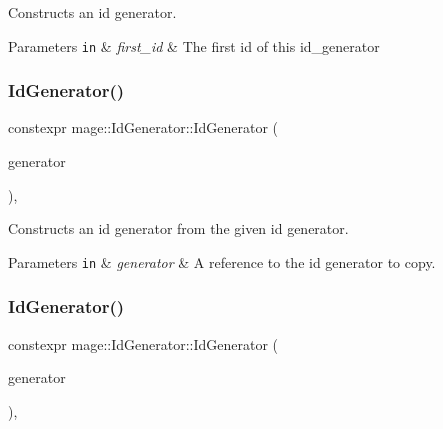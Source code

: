 Constructs an id generator.


\begin{DoxyParams}[1]{Parameters}
\mbox{\tt in}  & {\em first\+\_\+id} & The first id of this id\+\_\+generator \\
\hline
\end{DoxyParams}
\hypertarget{classmage_1_1_id_generator_ac7c7bc2371a537ca742cf87288d75817}{}\label{classmage_1_1_id_generator_ac7c7bc2371a537ca742cf87288d75817} 
\subsubsection{\texorpdfstring{Id\+Generator()}{IdGenerator()}\hspace{0.1cm}{\footnotesize\ttfamily [2/3]}}
{\footnotesize\ttfamily constexpr mage\+::\+Id\+Generator\+::\+Id\+Generator (\begin{DoxyParamCaption}\item[{const \hyperlink{classmage_1_1_id_generator}{Id\+Generator} \&}]{generator }\end{DoxyParamCaption})\hspace{0.3cm}{\ttfamily [delete]}, {\ttfamily [noexcept]}}

Constructs an id generator from the given id generator.


\begin{DoxyParams}[1]{Parameters}
\mbox{\tt in}  & {\em generator} & A reference to the id generator to copy. \\
\hline
\end{DoxyParams}
\hypertarget{classmage_1_1_id_generator_a5d6eb6a2ef08cd4ed765a61f9c330868}{}\label{classmage_1_1_id_generator_a5d6eb6a2ef08cd4ed765a61f9c330868} 
\subsubsection{\texorpdfstring{Id\+Generator()}{IdGenerator()}\hspace{0.1cm}{\footnotesize\ttfamily [3/3]}}
{\footnotesize\ttfamily constexpr mage\+::\+Id\+Generator\+::\+Id\+Generator (\begin{DoxyParamCaption}\item[{\hyperlink{classmage_1_1_id_generator}{Id\+Generator} \&\&}]{generator }\end{DoxyParamCaption})\hspace{0.3cm}{\ttfamily [default]}, {\ttfamily [noexcept]}}

